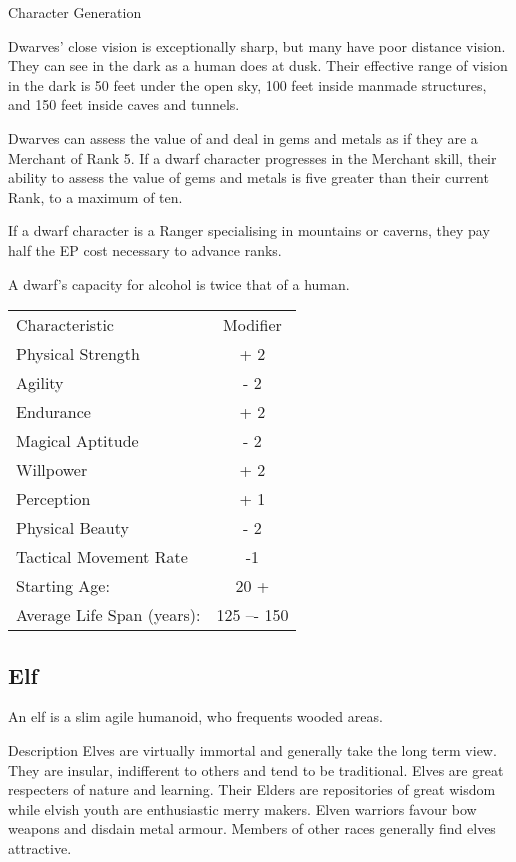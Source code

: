 \begin{Chapter}{Character Generation}
\begin{Enumerate}
\item Dwarves’ close vision is exceptionally sharp, but many have poor
  distance vision.  They can see in the dark as a human does at dusk.
  Their effective range of vision in the dark is 50 feet under the
  open sky, 100 feet inside manmade structures, and 150 feet inside
  caves and tunnels.

\item Dwarves can assess the value of and deal in gems and metals as
  if they are a Merchant of Rank 5.  If a dwarf character progresses
  in the Merchant skill, their ability to assess the value of gems and
  metals is five greater than their current Rank, to a maximum of ten.

\item If a dwarf character is a Ranger specialising in mountains or
  caverns, they pay half the EP cost necessary to advance ranks.

\item A dwarf’s capacity for alcohol is twice that of a human.

\end{Enumerate}

\begin{tabularx}{\columnwidth}{Xc} 
Characteristic			& Modifier \\
Physical Strength		& + 2 \\
Agility				& - 2 \\
Endurance			& + 2 \\
Magical Aptitude		& - 2 \\
Willpower			& + 2 \\
Perception			& + 1 \\
Physical Beauty			& - 2 \\
Tactical Movement Rate		& -1 \\
Starting Age:			& 20 + \\
Average Life Span (years):	& 125 –- 150 \\
\end{tabularx}

\subsection{Elf}

An elf is a slim agile humanoid, who frequents wooded areas.

\begin{Description}
\item[Description] Elves are virtually immortal and generally take the
  long term view.  They are insular, indifferent to others and tend to
  be traditional.  Elves are great respecters of nature and learning.
  Their Elders are repositories of great wisdom while elvish youth are
  enthusiastic merry makers.  Elven warriors favour bow weapons and
  disdain metal armour.  Members of other races generally find elves
  attractive.
\end{Description}


\end{Chapter}
